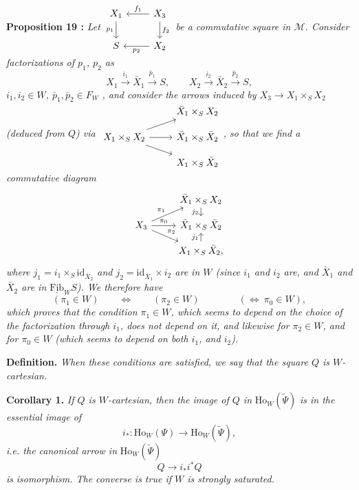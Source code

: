 \documentclass[11pt]{article}
\newcommand{\printedpage}[1]{\marginpar{\footnotesize p.~#1}}
\newcommand{\msp}[1]{\marginpar{\footnotesize [#1]}}
\newcommand{\Ho}{\mathrm{Ho}}
\begin{document}
\textbf{Proposition 19 :} \textit{Let $\begin{tikzcd}[ampersand replacement=\&] X_1 \arrow[d, "p_1"'] \& X_3 \arrow[l, "f_1"'] \arrow[d, "f_2"] \\ S \& X_2 \arrow[l, "p_2"] \end{tikzcd}$ be a commutative square in $\mathcal{M}$. Consider factorizations of $p_1$, $p_2$ as}
\[
X_1\xrightarrow{\ i_1\ }\bar{X}_1\xrightarrow{\ \bar{p}_1\ }S,\qquad X_2\xrightarrow{\ i_2\ }\bar{X}_2\xrightarrow{\ \bar{p}_2\ }S,
\]
\textit{$i_1,i_2\in W$, $\bar{p}_1,\bar{p}_2\in F_W$} \textit{, and consider the arrows induced by $X_3\longrightarrow X_1\times_S X_2$ (deduced from $Q$) via $\begin{tikzcd}[ampersand replacement=\&, row sep=small] \& \bar{X}_1\times_S X_2 \\ X_1\times_S X_2 \arrow[ur] \arrow[r] \arrow[dr] \& \bar{X}_1\times_S\bar{X}_2 \\ \& X_1\times_S\bar{X}_2 \end{tikzcd}$, so that we find a commutative diagram}
\[
\begin{tikzcd}[ampersand replacement=\&, row sep=small]
\& \bar{X}_1\times_S X_2 \arrow[d, "j_2"'] \\
X_3 \arrow[ur, "\pi_1"] \arrow[r, "\pi_0"] \arrow[dr, "\pi_2"] \& \bar{X}_1\times_S\bar{X}_2 \\
\& X_1\times_S\bar{X}_2, \arrow[u, "j_1"]
\end{tikzcd}
\]
\textit{where $j_1=i_1\times_S\mathrm{id}_{\bar{X}_2}$ and $j_2=\mathrm{id}_{\bar{X}_1}\times i_2$ are in $W$ (since $i_1$ and $i_2$ are, and $\bar{X}_1$ and $\bar{X}_2$ are in $\underline{\mathrm{Fib}}_W S$). We therefore have}
\[
(\pi_1\in W)\qquad\iff\qquad(\pi_2\in W)\qquad\qquad(\iff\ \pi_0\in W),
\]
\textit{which proves that the condition $\pi_1\in W$, which seems to depend on the choice of the factorization through $i_1$, does not depend on it, and likewise for $\pi_2\in W$, and for $\pi_0\in W$ (which seems to depend on both $i_1$, and $i_2$).}

\printedpage{168}

\msp{page 259}
\textbf{Definition.} \textit{When these conditions are satisfied, we say that the square $Q$ is $W$-cartesian.}

\textbf{Corollary 1.} \textit{If $Q$ is $W$-cartesian, then the image of $Q$ in} $\Ho_W(\tilde{\Psi})$ \textit{is in the essential image of}
\[
i_* : \Ho_W(\Psi)\longrightarrow\Ho_W(\tilde{\Psi}),
\]
\textit{i.e. the canonical arrow in} $\Ho_W(\tilde{\Psi})$
\[
Q\longrightarrow i_*i^*Q
\]
\textit{is} \textit{isomorphism. The converse is true if $W$ is strongly saturated.}
\end{document}
